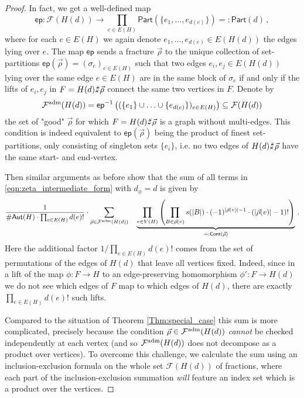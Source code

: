 \documentclass[authorcolumns,numberwithinsect]{no-lipics-v2022}
\def\fracture#1#2{\ensuremath{#1\raisebox{.2ex}{\rotatebox[origin=c]{-15}{$\sharp$}}#2}}
\def\fracture#1#2{\ensuremath{#1\raisebox{.2ex}{\rotatebox[origin=c]{-15}{$\sharp$}}#2}}
\begin{document}
\begin{proof}
In fact, we get a well-defined map
\begin{equation} \label{eqn:ep_map}
\mathsf{ep} : \mathcal{F}(H(d)) \to \prod_{e \in E(H)} \mathsf{Part}(\{e_1, \ldots, e_{d(e)}\}) =: \mathsf{Part}(d)\,,
\end{equation}
where for each $e \in E(H)$ we again denote $e_1, \ldots, e_{d(e)} \in E(H(d))$ the edges lying over $e$. The map $\mathsf{ep}$ sends a fracture $\vec\rho$ to the unique collection of set-partitions $\mathsf{ep}(\vec\rho) = (\sigma_e)_{e \in E(H)}$ such that two edges $e_i, e_j \in E(H(d))$ lying over the same edge $e \in E(H)$ are in the same block of $\sigma_e$ if and only if the lifts of $e_i, e_j$ in $F=\fracture{H(d)}{\vec\rho}$ connect the same two vertices in $F$.
Denote by 
\begin{equation} \label{eqn:F_adm_def}
    \mathcal{F}^\textup{adm}(H(d)) = \mathsf{ep}^{-1}\left((\{e_1\} \cup \ldots \cup \{e_{d(e)}\})_{e \in E(H)} \right) \subseteq \mathcal{F}(H(d))
\end{equation}
the set of "good" $\vec\rho$ for which $F=\fracture{H(d)}{\vec\rho}$ is a graph without multi-edges. This condition is indeed equivalent to $\mathsf{ep}(\vec\rho)$ being the product of finest set-partitions, only consisting of singleton sets $\{e_i\}$, i.e. no two edges of $\fracture{H(d)}{\vec\rho}$ have the same start- and end-vertex.

Then similar arguments as before show that the sum of all terms in \eqref{eqn:zeta_intermediate_form} with $d_\phi = d$ is given by
\begin{equation} \label{eqn:zeta_d_intermediate_form}
\frac{1}{\#\mathsf{Aut}(H) \cdot \prod_{e \in E(H)} d(e)!}  \cdot \sum_{\vec\rho \in \mathcal{F}^\textup{adm}(H(d))} \ \ \ \underbrace{\prod_{v\in V(H)}\left(\prod_{B \in \vec\rho(v)} s(|B|) \cdot (-1)^{|\vec\rho(v)| -1} \cdot (|\vec\rho(v)|-1)! \right)}_{=:\mathsf{Cont}(\vec\rho)} \,.
\end{equation}
Here the additional factor $1/\prod_{e \in E(H)} d(e)!$ comes from the set of permutations of the edges of $H(d)$ that leave all vertices fixed. Indeed, since in a lift of the map $\phi: F \to H$ to an edge-preserving homomorphism $\phi': F \to H(d)$ we do not see which edges of $F$ map to which edges of $H(d)$, there are exactly $\prod_{e \in E(H)} d(e)!$ such lifts. 

Compared to the situation of Theorem \ref{Thm:special_case} this sum is more complicated, precisely because the condition $\vec\rho \in \mathcal{F}^\textup{adm}(H(d))$ \emph{cannot} be checked independently at each vertex (and so $\mathcal{F}^\textup{adm}(H(d))$ does not decompose as a product over vertices). 
To overcome this challenge, we calculate the sum using an inclusion-exclusion formula on the whole set $\mathcal{F}(H(d))$ of fractions, where each part of the inclusion-exclusion summation \emph{will} feature an index set which is a product over the vertices.


\end{proof}
\end{document}
